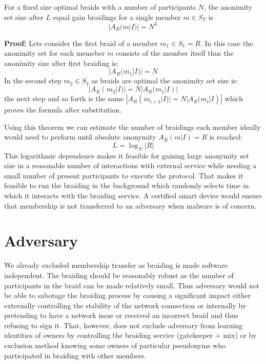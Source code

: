 \documentclass[12pt]{article}
\newenvironment{theorem}[2][Theorem]{\begin{trivlist}
\item[\hskip \labelsep {\bfseries #1}\hskip \labelsep {\bfseries #2.}]}{\end{trivlist}}
\begin{document}
\begin{theorem}{(optimal gain)}
  For a fixed size optimal braids with a number of participants $N$, the anonimity set size after $L$ equal gain braidings for a single member $m \in S_T$ is
  \begin{equation}
    |A_R(m|I)|  = N^L
  \end{equation}

  {\bf Proof:} Lets consider the first braid of a member $m_1 \in S_1 = R$. In this case the anonimity set for each memeber $m$ consists of the member itself thus the anonimity size after first braiding is:
  \begin{equation}
    |A_R(m_1|I)| = N
  \end{equation}
  In the second step $m_2 \in S_2$ as braids are optimal the anonimity set size is:
  \begin{equation}
    |A_R(m_2|I)| = N |A_R(m_1|I)|
  \end{equation}
  the next step and so forth is the same $|A_R(m_{i+1}|I)| = N |A_R(m_i|I)|$ which proves the formula after substitution.
\end{theorem}

Using this theorem we can estimate the number of braidings each member ideally would need to perform until absolute anonymity $A_R(m|I) = R$ is reached:
\begin{equation}
  L = \log_N |R| \label{eq:2}
\end{equation}
This logarithmic dependence makes it feasible for gaining large anonymity set size in a reasonable number of interactions with external service while needing a small number of present participants to execute the protocol. That makes it feasible to run the braiding in the background which randomly selects time in which it interacts with the braiding service. A certified smart device would ensure that membership is not transferred to an adversary when malware is of concern.

\section*{Adversary}

We already excluded membership transfer as braiding is made software independent. The braiding should be reasonably robust as the number of participants in the braid can be made relatively small. Thus adversary would not be able to sabotage the braiding process by causing a significant impact either externally controlling the stability of the network connection or internally by pretending to have a network issue or received an incorrect braid and thus refusing to sign it. That, however, does not exclude adversary from learning identities of owners by controlling the braiding service (gatekeeper + mix) or by exclusion method knowing some owners of particular pseudonyms who participated in braiding with other members.
\end{document}
